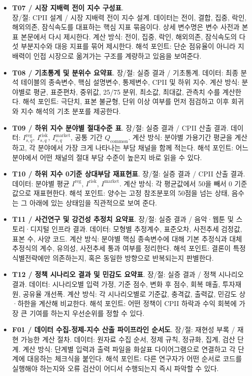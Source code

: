 \documentclass[11pt,a4paper]{report}
\newenvironment{summarylist}{\begin{itemize}[leftmargin=1.8em,itemsep=0.35em,topsep=0.35em]\RaggedRight}{\end{itemize}}
\begin{document}
\begin{summarylist}
  \item \textbf{T07 / 시장 지배력 전이 지수 구성표}.\\ 장/절: CPII 설계 / 시장 지배력 전이 지수 설계. 데이터는 전이, 결합, 집중, 락인, 해외의존, 잠식속도를 대표하는 핵심 지표 묶음이다. 상세 변수명은 변수 사전과 본 표 본문에서 다시 제시한다. 계산 방식: 전이, 집중, 락인, 해외의존, 잠식속도의 다섯 부분지수와 대응 지표를 묶어 제시한다. 해석 포인트: 단순 점유율이 아니라 지배력이 인접 시장으로 옮겨가는 구조를 계량하고 있음을 보여준다.
  \item \textbf{T08 / 기초통계 및 분위수 요약표}. 장/절: 실증 결과 / 기초통계. 데이터: 최종 분석 테이블의 종속변수, 핵심 설명변수, 통제변수, CPII 및 하위 지수. 계산 방식: 분야별로 평균, 표준편차, 중위값, 25/75 분위, 최소값, 최대값, 관측치 수를 계산한다. 해석 포인트: 극단치, 표본 불균형, 단위 이상 여부를 먼저 점검하고 이후 회귀와 지수 해석의 기초 분포를 제공한다.
  \item \textbf{T09 / 하위 지수 분야별 절대수준 표}. 장/절: 실증 결과 / CPII 산출 결과. 데이터: $I^{\mathrm{reg}}_{s,q}$, $I^{\mathrm{risk}}_{s,q}$, $I^{\mathrm{market}}_{s,q}$, 공통 기간 $Q_{\mathrm{common}}$. 계산 방식: 분야별 가용기간 평균을 계산하고, 각 분야에서 가장 크게 나타나는 부담 채널을 함께 적는다. 해석 포인트: 어느 분야에서 어떤 채널의 절대 부담 수준이 높은지 바로 읽을 수 있다.
  \item \textbf{T10 / 하위 지수 0기준 상대부담 재표현표}. 장/절: 실증 결과 / CPII 산출 결과. 데이터: 분야별 평균 $I^{\mathrm{reg}}$, $I^{\mathrm{risk}}$, $I^{\mathrm{market}}$. 계산 방식: 각 평균값에서 50을 빼서 0 기준 값으로 재표현한다. 해석 포인트: 양수는 고정 참조분포의 50점을 넘는 상태, 음수는 그 아래에 있는 상태임을 직관적으로 보여 준다.
  \item \textbf{T11 / 사건연구 및 강건성 추정치 요약표}. 장/절: 실증 결과 / 음악·웹툰 및 스토리·디지털 인프라 결과. 데이터: 모형별 추정계수, 표준오차, 사전추세 검정값, 표본 수, 사양 코드. 계산 방식: 분야별 핵심 종속변수에 대해 기본 추정식과 대체 추정식의 계수, 유의성, 사전추세 통과 여부를 정리한다. 해석 포인트: 결론이 특정 식별전략에만 의존하는지, 혹은 동일한 방향으로 반복되는지 판별한다.
  \item \textbf{T12 / 정책 시나리오 결과 및 민감도 요약표}. 장/절: 실증 결과 / 정책 시나리오 결과. 데이터: 시나리오별 입력 가정, 기준 점수, 변화 후 점수, 회복 매출, 투자재원, 공유율 개선폭. 계산 방식: 각 시나리오별로 기준값, 충격값, 출력값, 민감도 상·하한을 계산해 비교한다. 해석 포인트: 어떤 정책이 CPII 하락과 수익 회복에 가장 큰 기여를 하는지 우선순위를 정할 수 있다.
  \item \textbf{F01 / 데이터 수집-정제-지수 산출 파이프라인 순서도}. 장/절: 재현성 부록 / 재현 가능한 계산 절차. 데이터: 원자료 수집 순서, 정제 규칙, 정규화, 집계, 검산 단계. 계산 방식: 단계별 입력과 출력 파일을 화살표 다이어그램으로 연결하고 각 단계에 대응하는 체크식을 붙인다. 해석 포인트: 다른 연구자가 어떤 순서로 코드를 실행해야 하는지와 오류 검산이 어디서 수행되는지 즉시 파악할 수 있다.

\end{summarylist}
\end{document}
